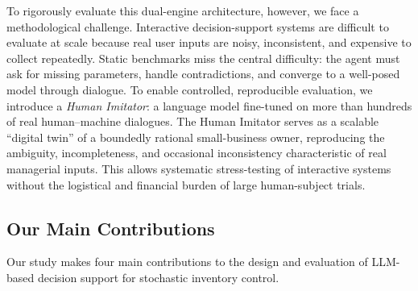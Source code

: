 To rigorously evaluate this dual-engine architecture, however, we face a methodological challenge.
Interactive decision-support systems are difficult to evaluate at scale because real user inputs are noisy, inconsistent, and expensive to collect repeatedly. Static benchmarks miss the central difficulty: the agent must ask for missing parameters, handle contradictions, and converge to a well-posed model through dialogue. To enable controlled, reproducible evaluation, we introduce a \emph{Human Imitator}: a language model fine-tuned on more than hundreds of real human--machine dialogues. The Human Imitator serves as a scalable “digital twin” of a boundedly rational small-business owner, reproducing the ambiguity, incompleteness, and occasional inconsistency characteristic of real managerial inputs. This allows systematic stress-testing of interactive systems without the logistical and financial burden of large human-subject trials.



\subsection{Our Main Contributions}


Our study makes four main contributions to the design and evaluation of LLM-based decision support for stochastic inventory control.

